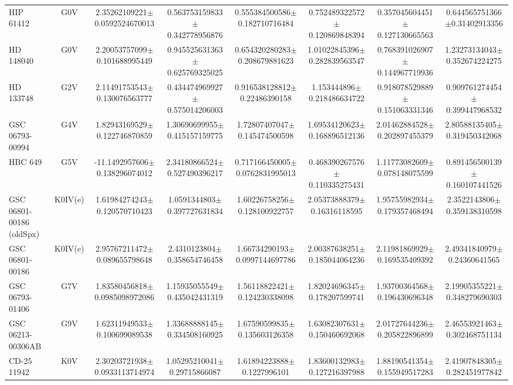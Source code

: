 \begin{table}
\begin{center}
\begin{tabular}{l|c|c|c|c|c|c|c}
HIP 61412 & G0V & 2.35262109221$\pm$0.0592524670013 & 0.563753159833$\pm$0.342778956876 & 0.555384500586$\pm$0.182710716484 & 0.752489322572$\pm$0.120869848394 & 0.357045604451$\pm$0.127130665563 & 0.644565751366$\pm$0.31402913356 \\
HD 148040 & G0V & 2.20053757099$\pm$0.101688995449 & 0.945525631363$\pm$0.625769325025 & 0.654320280283$\pm$0.208679881623 & 1.01022845396$\pm$0.282839563547 & 0.768391026907$\pm$0.144967719936 & 1.23273134043$\pm$0.352674224275 \\
HD 133748 & G2V & 2.11491753543$\pm$0.130076563777 & 0.434474969927$\pm$0.575014206003 & 0.916538128812$\pm$0.22486390158 & 1.153444896$\pm$0.218486634722 & 0.918078529889$\pm$0.151063331346 & 0.909761274454$\pm$0.399447968532 \\
GSC 06793-00994 & G4V & 1.82943169529$\pm$0.122746870859 & 1.30690699955$\pm$0.415157159775 & 1.72807407047$\pm$0.145474500598 & 1.69534120623$\pm$0.168896512136 & 2.01462884528$\pm$0.202897455379 & 2.80588135405$\pm$0.319450342068 \\
HBC 649 & G5V & -11.1492957606$\pm$0.138296074012 & 2.34180866524$\pm$0.527490396217 & 0.717166450005$\pm$0.0762831995013 & 0.468390267576$\pm$0.110335275431 & 1.11773082609$\pm$0.078148075599 & 0.891456500139$\pm$0.160107441526 \\
GSC 06801-00186 (oldSpx) & K0IV(e) & 1.61984274243$\pm$0.120570710423 & 1.0591344803$\pm$0.397727631834 & 1.60226758256$\pm$0.128100922757 & 2.05373888379$\pm$0.16316118595 & 1.95755982934$\pm$0.179357468494 & 2.3522143806$\pm$0.359138310598 \\
GSC 06801-00186 & K0IV(e) & 2.95767211472$\pm$0.089655798648 & 2.4310123804$\pm$0.358654746458 & 1.66734290193$\pm$0.0997144697786 & 2.00387638251$\pm$0.185044064236 & 2.11981869929$\pm$0.169535409392 & 2.49341840979$\pm$0.24360641565 \\
GSC 06793-01406 & G7V & 1.83580456818$\pm$0.0985098972086 & 1.15935055549$\pm$0.435042431319 & 1.56118822421$\pm$0.124230338098 & 1.82024696345$\pm$0.178207599741 & 1.93700364568$\pm$0.196430696348 & 2.19905355221$\pm$0.348279690303 \\
GSC 06213-00306AB & G9V & 1.62311949533$\pm$0.100699089538 & 1.33688888145$\pm$0.334508160925 & 1.67590599835$\pm$0.135603126358 & 1.63082307631$\pm$0.150460692068 & 2.01727644236$\pm$0.205822896899 & 2.46553921463$\pm$0.302468751134 \\
CD-25 11942 & K0V & 2.30203721938$\pm$0.0933113714974 & 1.05295210041$\pm$0.29715866087 & 1.61894223888$\pm$0.1227996101 & 1.83600132983$\pm$0.127216397988 & 1.88190541354$\pm$0.155949517283 & 2.41907848305$\pm$0.282451977842 \\

\end{tabular}
\end{center}
\end{table}
